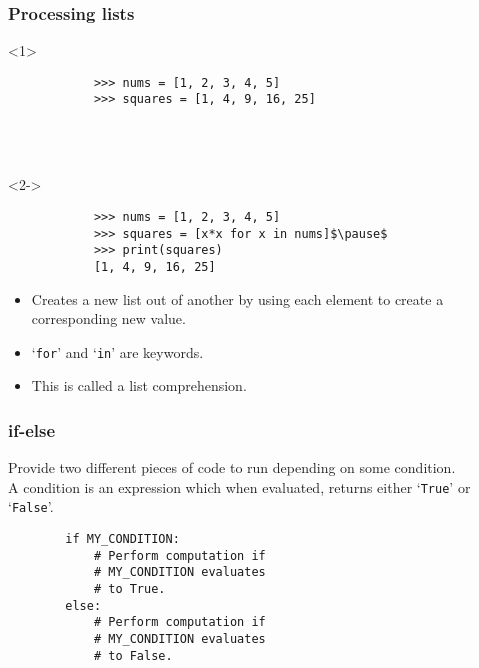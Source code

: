 \documentclass[notes]{beamer}
\begin{document}
	\begin{frame}[fragile]
		\frametitle{Processing lists}
		
		\begin{onlyenv}<1>
			\begin{lstlisting}
			>>> nums = [1, 2, 3, 4, 5]
			>>> squares = [1, 4, 9, 16, 25]
			\end{lstlisting}
			
			~ \\
			~ \\
			
		\end{onlyenv}
		
		\pause
		
		\begin{onlyenv}<2->
			\begin{lstlisting}
			>>> nums = [1, 2, 3, 4, 5]
			>>> squares = [x*x for x in nums]$\pause$
			>>> print(squares)
			[1, 4, 9, 16, 25]
			\end{lstlisting}
		\end{onlyenv}
		
		\pause
		
		\begin{itemize}
			\item Creates a new list out of another by using each element to create a corresponding new value.
			\item `\lstinline|for|' and `\lstinline|in|' are keywords.
			\item This is called a \colorbox{jargonbg}{list comprehension}.
		\end{itemize}
	\end{frame}
	
	
	\begin{frame}[fragile]
		\frametitle{if-else}
		
		Provide two different pieces of code to run depending on some condition.\\
		\pause
		A condition is an expression which when evaluated, returns either `\lstinline|True|' or `\lstinline|False|'.
		
		\pause
		\begin{lstlisting}
		if MY_CONDITION:
		    # Perform computation if
		    # MY_CONDITION evaluates
		    # to True.
		else:
		    # Perform computation if
		    # MY_CONDITION evaluates
		    # to False.
		\end{lstlisting}
	\end{frame}
	
\end{document}
